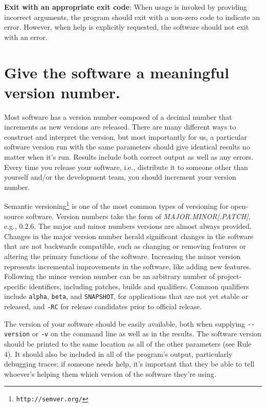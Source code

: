 \documentclass[10pt,letterpaper]{article}
\newcommand{\withurl}[2]{{#1}\footnote{\texttt{#2}}}
\begin{document}
\textbf{Exit with an appropriate exit code}: When usage is invoked by
providing incorrect arguments, the program should exit with a non-zero
code to indicate an error. However, when help is explicitly requested,
the software should not exit with an error.

\section{Give the software a meaningful version number.}

Most software has a version number composed of a decimal number that
increments as new versions are released. There are many different ways
to construct and interpret the version, but most importantly for us, a
particular software version run with the same parameters should give
identical results no matter when it's run. Results include both correct
output as well as any errors.
Every time you release your software, i.e., distribute it to
someone other than yourself and/or the development team, you should
increment your version number.

\withurl{Semantic versioning}{http://semver.org/} is one of the most common
types of versioning for open-source software. Version numbers take the
form of \emph{MAJOR.MINOR{[}.PATCH{]}}, e.g., 0.2.6. The major and
minor numbers versions are almost always provided. Changes in the major
version number herald significant changes in the software that are not
backwards compatible, such as changing or removing features or altering
the primary functions of the software. Increasing the minor version
represents incremental improvements in the software, like adding new
features. Following the minor version number can be an arbitrary number
of project-specific identifiers, including patches, builds and qualifiers.
Common qualifiers include \texttt{alpha}, \texttt{beta}, and \texttt{SNAPSHOT},
for applications that are
not yet stable or released, and \texttt{-RC} for release candidates prior
to official release.

The version of your software should be easily available, both when
supplying \texttt{-\/-version} or \texttt{-v} on the command line as
well as in the results. The software version should be printed to the
same location as all of the other parameters (see Rule 4).  It should
also be included in all of the program's output, particularly debugging
traces: if someone needs help, it's important that they be able to tell
whoever's helping them which version of the software they're using.
\end{document}
